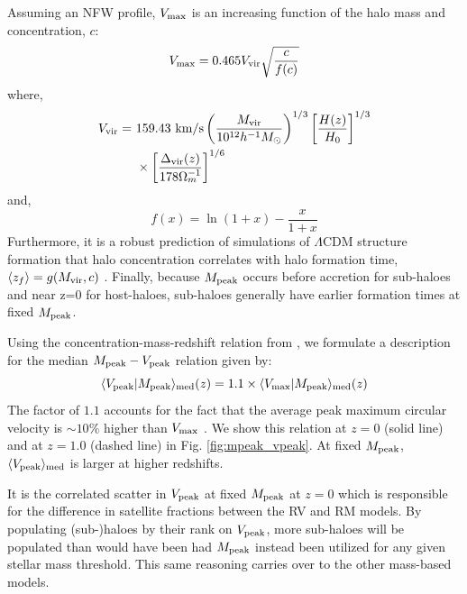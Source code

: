 \documentclass[useAMS,fleqn,usenatbib]{mnras}
\begin{document}
Assuming an NFW profile, $V_{\rm max}$ is an increasing function of the halo mass and concentration, $c$:
%
\begin{equation}
V_{\rm max} = 0.465V_{\rm vir}\sqrt{\frac{c}{f(c)}}
\end{equation}
%
where,
%
\begin{align}
V_{\rm vir} = ~&159.43~{\rm km/s}\left(\frac{M_{\rm vir}}{10^{12}h^{-1}M_{\odot}}\right)^{1/3}\left[\frac{H(z)}{H_0}\right]^{1/3} \\ \nonumber
 &\times \left[\frac{\Delta_{\rm vir}(z)}{178\Omega^{-1}_m}\right]^{1/6}
\end{align}
%
and,
%
\begin{equation}
f(x) = \ln(1+x) - \frac{x}{1+x}
\end{equation}
%
Furthermore, it is a robust prediction of simulations of $\Lambda$CDM structure formation that halo concentration correlates with halo formation time, $\langle z_f \rangle = g(M_{\rm vir}, c)$ \citep[e.g.][]{Wechsler:2002kh}.  Finally, because $M_{\rm peak}$ occurs before accretion for sub-haloes and near z=0 for host-haloes, sub-haloes generally have earlier formation times at fixed $M_{\rm peak}$.   

Using the concentration-mass-redshift relation from \citet{Maccio:2009bs}, we formulate a description for the median $M_{\rm peak}-V_{\rm peak}$ relation given by:
%
\begin{equation}
\label{eq:vpeak}
\langle V_{\rm peak} | M_{\rm peak}\rangle_{\rm med}(z) = 1.1\times \langle V_{\rm max}|M_{\rm peak}\rangle_{\rm med}(z)
\end{equation}
%
The factor of $1.1$ accounts for the fact that the average peak maximum circular velocity is $\sim 10\%$ higher than $V_{\rm max}$ \citep{Behroozi:2014bg}.  We show this relation at $z=0$ (solid line) and at $z=1.0$ (dashed line) in Fig. \ref{fig:mpeak_vpeak}.  At fixed $M_{\rm peak}$, $\langle V_{\rm peak}\rangle_{\rm med}$ is larger at higher redshifts. 

It is the correlated scatter in $V_{\rm peak}$ at fixed $M_{\rm peak}$ at $z=0$ which is responsible for the difference in satellite fractions between the RV and RM models.  By populating (sub-)haloes by their rank on $V_{\rm peak}$, more sub-haloes will be populated than would have been had $M_{\rm peak}$ instead been utilized for any given stellar mass threshold.  This same reasoning carries over to the other mass-based models.  
\end{document}
